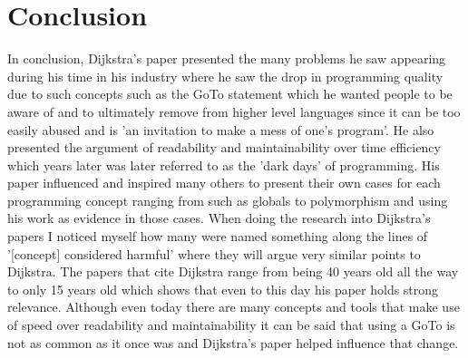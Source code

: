 \documentclass{article}
\begin{document}
\section{Conclusion}
In conclusion, Dijkstra's paper presented the many problems he saw appearing during his time in his industry where he saw the drop in programming quality due to such concepts such as the GoTo statement which he wanted people to be aware of and to ultimately remove from higher level languages since it can be too easily abused and is 'an invitation to make a  mess of one's program'\cite{dijkstra1968_goto}. He also presented the argument of readability and maintainability over time efficiency which years later was later referred to as the 'dark days' \cite{Ashenhurst:1978:AFS:359327.359339} of programming. His paper influenced and inspired many others to present their own cases for each programming concept ranging from such as globals to polymorphism and using his work as evidence in those cases. When doing the research into Dijkstra's papers I noticed myself how many were named something along the lines of '[concept] considered harmful' where they will argue very similar points to Dijkstra. The papers that cite Dijkstra range from being 40 years old all the way to only 15 years old which shows that even to this day his paper holds strong relevance. Although even today there are many concepts and tools that make use of speed over readability and maintainability it can be said that using a GoTo is not as common as it once was and Dijkstra's paper helped influence that change.



\end{document}
